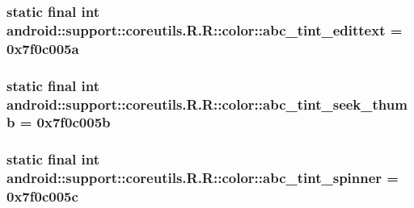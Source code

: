 \hypertarget{classandroid_1_1support_1_1coreutils_1_1_r_1_1color_d95cef248d10e3b4bc5015955243bc73}{
\subsubsection[{abc\_\-tint\_\-edittext}]{\setlength{\rightskip}{0pt plus 5cm}static final int android::support::coreutils.R.R::color::abc\_\-tint\_\-edittext = 0x7f0c005a}}
\label{classandroid_1_1support_1_1coreutils_1_1_r_1_1color_d95cef248d10e3b4bc5015955243bc73}


\hypertarget{classandroid_1_1support_1_1coreutils_1_1_r_1_1color_880c69088fb2eb11db505c6525b10b23}{
\subsubsection[{abc\_\-tint\_\-seek\_\-thumb}]{\setlength{\rightskip}{0pt plus 5cm}static final int android::support::coreutils.R.R::color::abc\_\-tint\_\-seek\_\-thumb = 0x7f0c005b}}
\label{classandroid_1_1support_1_1coreutils_1_1_r_1_1color_880c69088fb2eb11db505c6525b10b23}


\hypertarget{classandroid_1_1support_1_1coreutils_1_1_r_1_1color_43a2b959b722708001694f77e74ee32c}{
\subsubsection[{abc\_\-tint\_\-spinner}]{\setlength{\rightskip}{0pt plus 5cm}static final int android::support::coreutils.R.R::color::abc\_\-tint\_\-spinner = 0x7f0c005c}}
\label{classandroid_1_1support_1_1coreutils_1_1_r_1_1color_43a2b959b722708001694f77e74ee32c}


